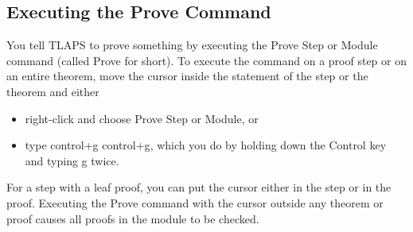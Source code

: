 \documentclass[fleqn,leqno]{article}
\begin{document}
  \vspace{-2\baselineskip}%
\subsection*{Executing the Prove Command}

You tell TLAPS to prove something by executing the \textsf{Prove Step
or Module} command (called \textsf{Prove} for short).  To execute the
command on a proof step or on an entire theorem, move the 
cursor
inside the statement of the step or the theorem and either
\begin{itemize}
\item right-click and choose \textsf{Prove Step or Module}, or

\item type \textsf{control+g} \textsf{control+g}, which you do by holding
down the \textsf{Control} key and typing \textsf{g} twice.
\end{itemize}
For a step with a leaf proof, you can put the cursor either in the
step or in the proof.  Executing the \textsf{Prove} command with
the cursor outside any theorem or proof causes all proofs in the
module to be checked.
%
\end{document}
